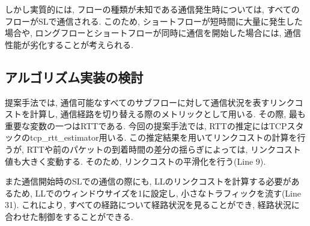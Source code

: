 しかし実質的には, フローの種類が未知である通信発生時については, すべてのフローがSLで通信される. 
このため, ショートフローが短時間に大量に発生した場合や, ロングフローとショートフローが同時に通信を開始した場合には, 通信性能が劣化することが考えられる. 


\subsection{アルゴリズム実装の検討}
提案手法では, 通信可能なすべてのサブフローに対して通信状況を表すリンクコストを計算し, 通信経路を切り替える際のメトリックとして用いる. 
その際, 最も重要な変数の一つはRTTである. 
今回の提案手法では, RTTの推定にはTCPスタックのtcp\_rtt\_estimator用いる.
この推定結果を用いてリンクコストの計算を行うが, RTTや前のパケットの到着時間の差分の揺らぎによっては, リンクコスト値も大きく変動する. 
そのため, リンクコストの平滑化を行う(Line 9). 

また通信開始時のSLでの通信の際にも, LLのリンクコストを計算する必要があるため, LLでのウィンドウサイズを1に設定し,
小さなトラフィックを流す(Line 31).
これにより, すべての経路について経路状況を見ることができ, 経路状況に合わせた制御をすることができる. 

